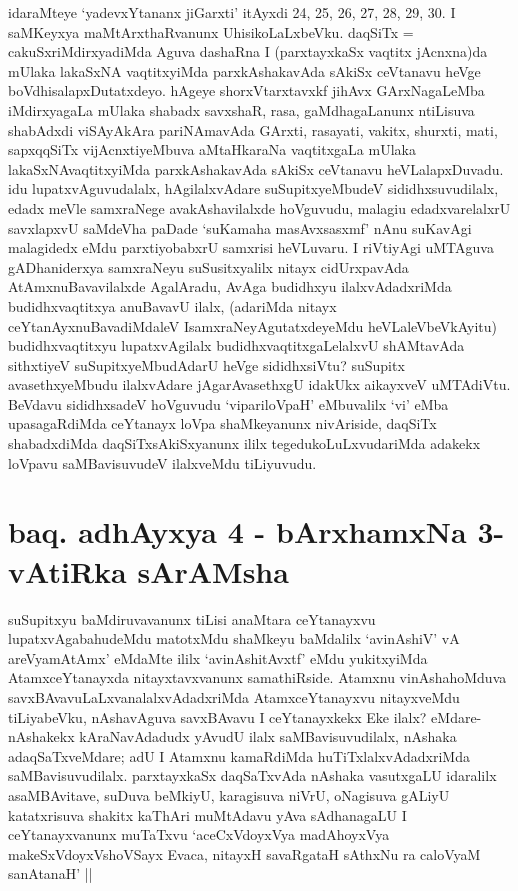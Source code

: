 \begin{artha}
idaraMteye `yadevxYtananx jiGarxti' itAyxdi 24, 25, 26, 27, 28, 29, 30. I saMKeyxya maMtArxthaRvanunx UhisikoLaLxbeVku. daqSiTx = cakuSxriMdirxyadiMda Aguva dashaRna I (parxtayxkaSx vaqtitx jAcnxna)da mUlaka lakaSxNA vaqtitxyiMda parxkAshakavAda sAkiSx ceVtanavu heVge boVdhisalapxDutatxdeyo. hAgeye shorxVtarxtavxkf jihAvx GArxNagaLeMba iMdirxyagaLa mUlaka shabadx savxshaR, rasa, gaMdhagaLanunx ntiLisuva shabAdxdi viSAyAkAra pariNAmavAda GArxti, rasayati, vakitx, shurxti, mati, sapxqqSiTx vijAcnxtiyeMbuva aMtaHkaraNa vaqtitxgaLa mUlaka lakaSxNAvaqtitxyiMda parxkAshakavAda sAkiSx ceVtanavu heVLalapxDuvadu. idu lupatxvAguvudalalx, hAgilalxvAdare suSupitxyeMbudeV sididhxsuvudilalx, edadx meVle samxraNege avakAshavilalxde hoVguvudu, malagiu edadxvarelalxrU savxlapxvU saMdeVha paDade `suKamaha masAvxsasxmf' nAnu suKavAgi malagidedx eMdu parxtiyobabxrU samxrisi heVLuvaru. I riVtiyAgi uMTAguva gADhaniderxya samxraNeyu suSusitxyalilx nitayx cidUrxpavAda AtAmxnuBavavilalxde AgalAradu, AvAga budidhxyu ilalxvAdadxriMda budidhxvaqtitxya anuBavavU ilalx, (adariMda nitayx ceYtanAyxnuBavadiMdaleV IsamxraNeyAgutatxdeyeMdu heVLaleVbeVkAyitu) budidhxvaqtitxyu lupatxvAgilalx budidhxvaqtitxgaLelalxvU shAMtavAda sithxtiyeV suSupitxyeMbudAdarU heVge sididhxsiVtu? suSupitx avasethxyeMbudu ilalxvAdare jAgarAvasethxgU idakUkx aikayxveV uMTAdiVtu. BeVdavu sididhxsadeV hoVguvudu `vipariloVpaH' eMbuvalilx `vi' eMba upasagaRdiMda ceYtanayx loVpa shaMkeyanunx nivAriside, daqSiTx shabadxdiMda daqSiTxsAkiSxyanunx ililx tegedukoLuLxvudariMda adakekx loVpavu saMBavisuvudeV ilalxveMdu tiLiyuvudu.
\end{artha}



\section*{baq. adhAyxya 4 - bArxhamxNa 3-vAtiRka sArAMsha}

\begin{artha}%
suSupitxyu baMdiruvavanunx tiLisi anaMtara ceYtanayxvu lupatxvAgabahudeMdu matotxMdu shaMkeyu baMdalilx `avinAshiV' vA areV\s yamAtAmx' eMdaMte ililx `avinAshitAvxtf' eMdu yukitxyiMda AtamxceYtanayxda nitayxtavxvanunx samathiRside. Atamxnu vinAshahoMduva savxBAvavuLaLxvanalalxvAdadxriMda AtamxceYtanayxvu nitayxveMdu tiLiyabeVku, nAshavAguva savxBAvavu I ceYtanayxkekx Eke ilalx? eMdare- nAshakekx kAraNavAdadudx yAvudU ilalx saMBavisuvudilalx, nAshaka adaqSaTxveMdare; adU I Atamxnu kamaRdiMda huTiTxlalxvAdadxriMda saMBavisuvudilalx. parxtayxkaSx daqSaTxvAda nAshaka vasutxgaLU idaralilx asaMBAvitave, suDuva beMkiyU, karagisuva niVrU, oNagisuva gALiyU katatxrisuva shakitx kaThAri muMtAdavu yAva sAdhanagaLU I ceYtanayxvanunx muTaTxvu `aceCxVdoyxV\s ya madAhoyxV\s ya makeSxVdoyxV\s shoVSayx Evaca, nitayxH savaRgataH sAthxNu ra caloV\s yaM sanAtanaH' ||
\end{artha}

